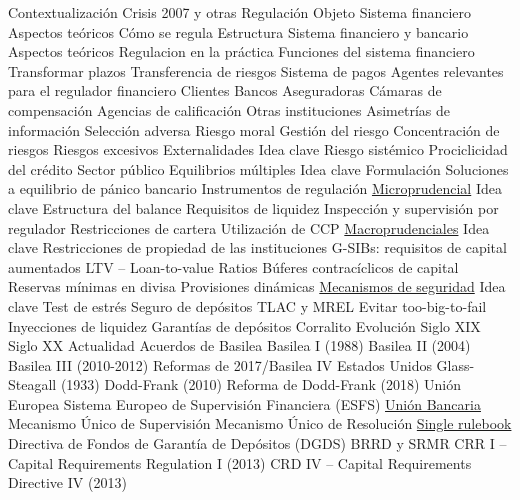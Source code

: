 \documentclass{nuevotema}
\begin{document}
\begin{esquema}[enumerate]
	\1[] 
		\2 Contextualización
			\3 Crisis 2007 y otras
			\3 Regulación
		\2 Objeto
			\3 Sistema financiero
			\3 Aspectos teóricos
			\3 Cómo se regula
		\2 Estructura
			\3 Sistema financiero y bancario
			\3 Aspectos teóricos
			\3 Regulacion en la práctica
	\1 
		\2 Funciones del sistema financiero
			\3 Transformar plazos
			\3 Transferencia de riesgos
			\3 Sistema de pagos
		\2 Agentes relevantes para el regulador financiero
			\3 Clientes
			\3 Bancos
			\3 Aseguradoras
			\3 Cámaras de compensación
			\3 Agencias de calificación
			\3 Otras instituciones
	\1 
		\2 Asimetrías de información
			\3 Selección adversa
			\3 Riesgo moral
		\2 Gestión del riesgo
			\3 Concentración de riesgos
			\3 Riesgos excesivos
		\2 Externalidades
			\3 Idea clave
			\3 Riesgo sistémico
			\3 Prociclicidad del crédito
			\3 Sector público
		\2 Equilibrios múltiples
			\3 Idea clave
			\3 Formulación
			\3 Soluciones a equilibrio de pánico bancario
		\2 Instrumentos de regulación
			\3 \underline{Microprudencial}
			\3 Idea clave
			\3 Estructura del balance
			\3 Requisitos de liquidez
			\3 Inspección y supervisión por regulador
			\3 Restricciones de cartera
			\3 Utilización de CCP
			\3 \underline{Macroprudenciales}
			\3 Idea clave
			\3 Restricciones de propiedad de las instituciones
			\3 G-SIBs: requisitos de capital aumentados
			\3 LTV -- Loan-to-value Ratios
			\3 Búferes contracíclicos de capital
			\3 Reservas mínimas en divisa
			\3 Provisiones dinámicas
			\3 \underline{Mecanismos de seguridad}
			\3 Idea clave
			\3 Test de estrés
			\3 Seguro de depósitos
			\3 TLAC y MREL
			\3 Evitar too-big-to-fail
			\3 Inyecciones de liquidez
			\3 Garantías de depósitos
			\3 Corralito
	\1 
		\2 Evolución
			\3 Siglo XIX
			\3 Siglo XX
			\3 Actualidad
		\2 Acuerdos de Basilea
			\3 Basilea I (1988)
			\3 Basilea II (2004)
			\3 Basilea III (2010-2012)
			\3 Reformas de 2017/Basilea IV
		\2 Estados Unidos
			\3 Glass-Steagall (1933)
			\3 Dodd-Frank (2010)
			\3 Reforma de Dodd-Frank (2018)
		\2 Unión Europea
			\3 Sistema Europeo de Supervisión Financiera (ESFS)
			\3 \underline{Unión Bancaria}
			\3 Mecanismo Único de Supervisión
			\3 Mecanismo Único de Resolución
			\3 \underline{Single rulebook}
			\3 Directiva de Fondos de Garantía de Depósitos (DGDS) 
			\3 BRRD y SRMR
			\3 CRR I -- Capital Requirements Regulation I (2013)
			\3 CRD IV -- Capital Requirements Directive IV (2013)

\end{esquema}
\end{document}
